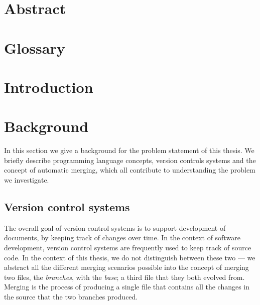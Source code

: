 \documentclass[11pt]{article}
\author{Kasper Videbæk}
\date{\today}
\begin{document}
\maketitle

\clearpage
\section*{Abstract}
\clearpage
\tableofcontents

\clearpage 

\section*{Glossary}

\clearpage 
\section{Introduction}


\clearpage 
\section{Background}
In this section we give a background for the problem statement of this thesis. We briefly describe programming language concepts, version controls systems and the concept of automatic merging, which all contribute to understanding the problem we investigate.

\subsection{Version control systems}
The overall goal of version control systems is to support development of documents, by keeping track of changes over time. In the context of software development, version control systems are frequently used to keep track of source code. In the context of this thesis, we do not distinguish between these two --- we abstract all the different merging scenarios possible into the concept of merging two files, the \textit{branches}, with the \textit{base}; a third file that they both evolved from. Merging is the process of producing a single file that contains all the changes in the source that the two branches produced.
\end{document}
